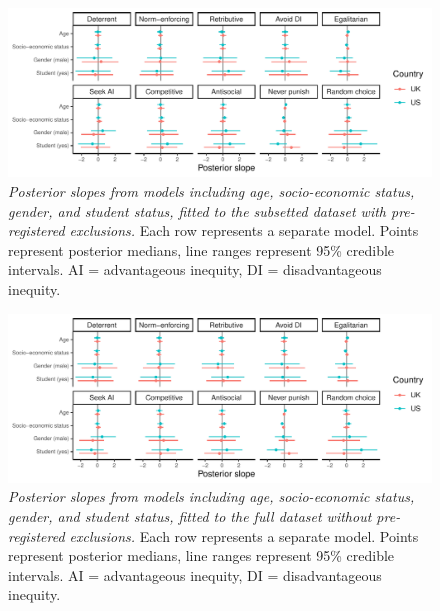 \documentclass[
  man,floatsintext]{apa6}
\begin{document}
\newpage







\begin{figure}
\centering
\includegraphics{manuscript_files/figure-latex/plotAllDems2-1.pdf}
\caption{\label{fig:plotAllDems2}\emph{Posterior slopes from models including age,
socio-economic status, gender, and student status, fitted to the subsetted
dataset with pre-registered exclusions.} Each row represents a separate model.
Points represent posterior medians, line ranges represent 95\% credible
intervals. AI = advantageous inequity, DI = disadvantageous inequity.}
\end{figure}

\newpage







\begin{figure}
\centering
\includegraphics{manuscript_files/figure-latex/plotAllDems1-1.pdf}
\caption{\label{fig:plotAllDems1}\emph{Posterior slopes from models including age,
socio-economic status, gender, and student status, fitted to the full dataset
without pre-registered exclusions.} Each row represents a separate model. Points
represent posterior medians, line ranges represent 95\% credible intervals. AI =
advantageous inequity, DI = disadvantageous inequity.}
\end{figure}
\end{document}
